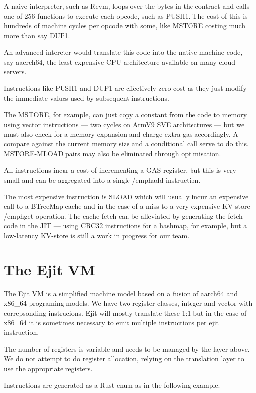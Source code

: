 \documentclass{article}
\begin{document}
A naive interpreter, such as Revm, loops over the bytes in the contract and calls
one of 256 functions to execute each opcode, such as PUSH1. The cost of this is hundreds
of machine cycles per opcode with some, like MSTORE costing much more than say DUP1.

An advanced intereter would translate this code into the native machine code, say aacrch64,
the least expensive CPU architecture available on many cloud servers.

Instructions like PUSH1 and DUP1 are effectively zero cost as they just modify the
immediate values used by subsequent instructions.

The MSTORE, for example, can just copy a constant from the code to memory using vector
instructions --- two cycles on ArmV9 SVE architectures --- but we must also check for
a memory expansion and charge extra gas accordingly. A compare against the current
memory size and a conditional call serve to do this. MSTORE-MLOAD pairs may also be
eliminated through optimisation.

All instructions incur a cost of incrementing a GAS register, but this is very small
and can be aggregated into a single /emph{add} instruction.

The most expensive instruction is SLOAD which will usually incur an expensive call to a BTreeMap
cache and in the case of a miss to a very expensive KV-store /emph{get} operation.
The cache fetch can be alleviated by generating the fetch code in the JIT --- using
CRC32 instructions for a hashmap, for example, but a low-latency KV-store is still a
work in progress for our team.

\section{The Ejit VM}\label{sec:ejit-vm}

The Ejit VM is a simplified machine model based on a fusion of aarch64 and x86\_64
programing models. We have two register classes, integer and vector with correpsonding
instrucions. Ejit will mostly translate these 1:1 but in the case of x86\_64
it is sometimes necessary to emit multiple instructions per ejit instruction.

The number of registers is variable and needs to be managed by the layer
above. We do not attempt to do register allocation, relying on the translation
layer to use the appropriate registers.

Instructions are generated as a Rust enum as in the following example.
\end{document}
